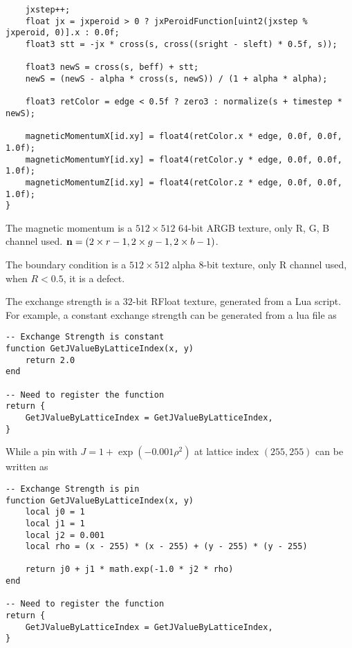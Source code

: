 \documentclass[aps,superscriptaddress,groupedaddress]{revtex4}  %
\begin{document}
\begin{lstlisting}
    jxstep++;
    float jx = jxperoid > 0 ? jxPeroidFunction[uint2(jxstep % jxperoid, 0)].x : 0.0f;
    float3 stt = -jx * cross(s, cross((sright - sleft) * 0.5f, s));

    float3 newS = cross(s, beff) + stt;
    newS = (newS - alpha * cross(s, newS)) / (1 + alpha * alpha);

    float3 retColor = edge < 0.5f ? zero3 : normalize(s + timestep * newS);

    magneticMomentumX[id.xy] = float4(retColor.x * edge, 0.0f, 0.0f, 1.0f);
    magneticMomentumY[id.xy] = float4(retColor.y * edge, 0.0f, 0.0f, 1.0f);
    magneticMomentumZ[id.xy] = float4(retColor.z * edge, 0.0f, 0.0f, 1.0f);
}
\end{lstlisting}

The magnetic momentum is a $512\times 512$ $64$-bit ARGB texture, only R, G, B channel used. ${\bf n}=(2 \times r - 1, 2 \times g - 1, 2 \times b - 1)$.

The boundary condition is a $512\times 512$ alpha $8$-bit texture, only R channel used, when $R < 0.5$, it is a defect.

The exchange strength is a $32$-bit RFloat texture, generated from a Lua script. For example, a constant exchange strength can be generated from a lua file as


\begin{lstlisting}
-- Exchange Strength is constant
function GetJValueByLatticeIndex(x, y)
    return 2.0
end

-- Need to register the function
return {
    GetJValueByLatticeIndex = GetJValueByLatticeIndex,
}
\end{lstlisting}

While a pin with $J=1+\exp \left(-0.001 \rho ^2\right)$ at lattice index $(255, 255)$ can be written as
\begin{lstlisting}
-- Exchange Strength is pin
function GetJValueByLatticeIndex(x, y)
    local j0 = 1
    local j1 = 1
    local j2 = 0.001
    local rho = (x - 255) * (x - 255) + (y - 255) * (y - 255)

    return j0 + j1 * math.exp(-1.0 * j2 * rho)
end

-- Need to register the function
return {
    GetJValueByLatticeIndex = GetJValueByLatticeIndex,
}
\end{lstlisting}
\end{document}
